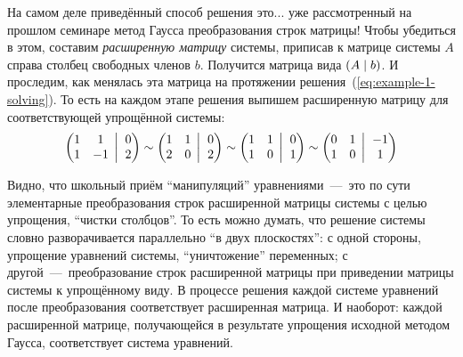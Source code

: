 \documentclass[a4paper,12pt]{article}
\newcommand{\BigMiddleTwo}{\;\left|\vphantom{\begin{pmatrix} 0\\0 \end{pmatrix}}\right.\;}
\begin{document}
  На самом деле приведённый способ решения это... уже рассмотренный на прошлом семинаре метод Гаусса преобразования строк матрицы!
  Чтобы убедиться в этом, составим \emph{расширенную матрицу} системы, приписав к матрице системы $A$ справа столбец свободных членов $b$.
  Получится матрица вида $(A \hm\mid b)$.
  И проследим, как менялась эта матрица на протяжении решения~(\ref{eq:example-1-solving}).
  То есть на каждом этапе решения выпишем расширенную матрицу для соответствующей упрощённой системы:
  \begin{equation}\label{eq:example-1-matrix-simplification}
    \left(
      \begin{matrix}
        1 & 1\\
        1 & -1
      \end{matrix}
      \BigMiddleTwo
      \begin{matrix}
        0\\
        2
      \end{matrix}
    \right)
    \sim\left(
      \begin{matrix}
        1 & 1\\
        2 & 0
      \end{matrix}
      \BigMiddleTwo
      \begin{matrix}
        0\\
        2
      \end{matrix}
    \right)
    \sim\left(
      \begin{matrix}
        1 & 1\\
        1 & 0
      \end{matrix}
      \BigMiddleTwo
      \begin{matrix}
        0\\
        1
      \end{matrix}
    \right)
    \sim\left(
      \begin{matrix}
        0 & 1\\
        1 & 0
      \end{matrix}
      \BigMiddleTwo
      \begin{matrix}
        -1\\
        1
      \end{matrix}
    \right)
  \end{equation}

  Видно, что школьный приём ``манипуляций'' уравнениями~---~это по сути элементарные преобразования строк расширенной матрицы системы с целью упрощения, ``чистки столбцов''.
  То есть можно думать, что решение системы словно разворачивается параллельно ``в двух плоскостях'': с одной стороны, упрощение уравнений системы, ``уничтожение'' переменных; с другой~---~преобразование строк расширенной матрицы при приведении матрицы системы к упрощённому виду.
  В процессе решения каждой системе уравнений после преобразования соответствует расширенная матрица.
  И наоборот: каждой расширенной матрице, получающейся в результате упрощения исходной методом Гаусса, соответствует система уравнений.
\end{document}
